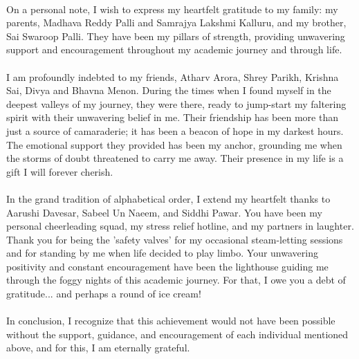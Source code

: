 \documentclass[12pt,a4paper]{article}
\begin{document}
\paragraph{}
On a personal note, I wish to express my heartfelt gratitude to my family: my parents, Madhava Reddy Palli and Samrajya Lakshmi Kalluru, and my brother, Sai Swaroop Palli. They have been my pillars of strength, providing unwavering support and encouragement throughout my academic journey and through life.
\paragraph{}
I am profoundly indebted to my friends, Atharv Arora, Shrey Parikh, Krishna Sai, Divya and Bhavna Menon. During the times when I found myself in the deepest valleys of my journey, they were there, ready to jump-start my faltering spirit with their unwavering belief in me. Their friendship has been more than just a source of camaraderie; it has been a beacon of hope in my darkest hours. The emotional support they provided has been my anchor, grounding me when the storms of doubt threatened to carry me away. Their presence in my life is a gift I will forever cherish.
\paragraph{}
In the grand tradition of alphabetical order, I extend my heartfelt thanks to Aarushi Davesar, Sabeel Un Naeem, and Siddhi Pawar. You have been my personal cheerleading squad, my stress relief hotline, and my partners in laughter. Thank you for being the 'safety valves' for my occasional steam-letting sessions and for standing by me when life decided to play limbo. Your unwavering positivity and constant encouragement have been the lighthouse guiding me through the foggy nights of this academic journey. For that, I owe you a debt of gratitude... and perhaps a round of ice cream!
\paragraph{}
In conclusion, I recognize that this achievement would not have been possible without the support, guidance, and encouragement of each individual mentioned above, and for this, I am eternally grateful.


\clearpage

\end{document}
